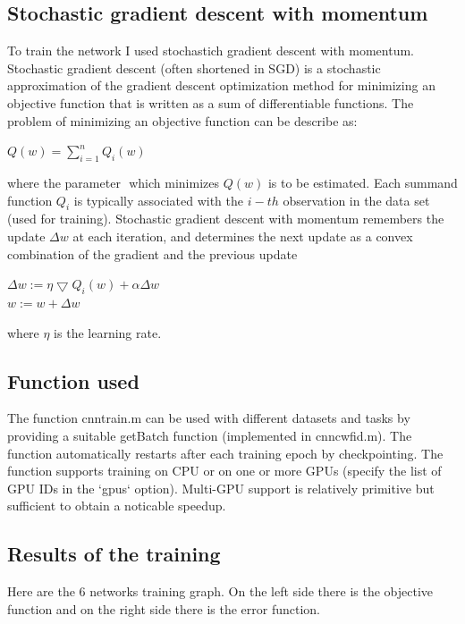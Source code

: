 \documentclass[]{report}
\begin{document}
\subsection{Stochastic gradient descent with momentum}

To train the network I used stochastich gradient descent with momentum. Stochastic gradient descent (often shortened in SGD) is a stochastic approximation of the gradient descent optimization method for minimizing an objective function that is written as a sum of differentiable functions. The problem of minimizing an objective function can be describe as:

\begin{center}

	$ Q(w)= \sum\limits_{i=1}^n Q_{i}(w) $

\end{center}

where the parameter $  $ which minimizes $ Q(w) $ is to be estimated. Each summand function $ Q_{i} $ is typically associated with the $ i-th $ observation in the data set (used for training). 
Stochastic gradient descent with momentum remembers the update $ \Delta w $ at each iteration, and determines the next update as a convex combination of the gradient and the previous update

\begin{center}

	$ \Delta w:= \eta \bigtriangledown  Q_{i}(w) + \alpha \Delta w $\\
	$ w := w+ \Delta w $

\end{center}

where $ \eta $ is the learning rate.

\subsection{Function used}
The function cnn\textunderscore train.m can be used with different datasets and tasks by providing a suitable getBatch function (implemented in  cnn\textunderscore cwfid.m). The function automatically restarts after each training epoch by checkpointing. The function supports training on CPU or on one or more GPUs (specify the list of GPU IDs in the `gpus` option). Multi-GPU support is relatively primitive but sufficient to obtain a noticable speedup.

\subsection{Results of the training}
Here are the 6 networks training graph. On the left side there is the objective function and on the right side there is the error function.
\end{document}
